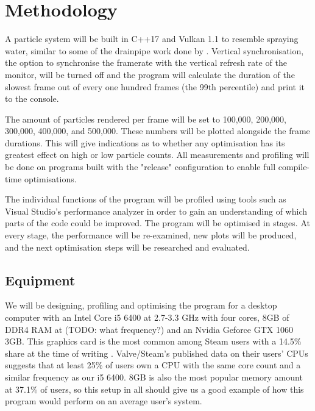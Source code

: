 \documentclass[11pt, a4paper, twocolumn]{article}
\begin{document}
\section{Methodology}

A particle system will be built in C++17 and Vulkan 1.1 to resemble spraying water, similar to some of the drainpipe work done by \citet{Tatarchuk2006}. Vertical synchronisation, the option to synchronise the framerate with the vertical refresh rate of the monitor, will be turned off and the program will calculate the duration of the slowest frame out of every one hundred frames (the 99th percentile) and print it to the console.


The amount of particles rendered per frame will be set to 100,000, 200,000, 300,000, 400,000, and 500,000. These numbers will be plotted alongside the frame durations. This will give indications as to whether any optimisation has its greatest effect on high or low particle counts. All measurements and profiling will be done on programs built with the "release" configuration to enable full compile-time optimisations.

The individual functions of the program will be profiled using tools such as Visual Studio's performance analyzer \citep{VSPerfTools} in order to gain an understanding of which parts of the code could be improved. The program will be optimised in stages. At every stage, the performance will be re-examined, new plots will be produced, and the next optimisation steps will be researched and evaluated.

\subsection{Equipment}

We will be designing, profiling and optimising the program for a desktop computer with an Intel Core i5 6400 at 2.7-3.3 GHz with four cores, 8GB of DDR4 RAM at (TODO: what frequency?) and an Nvidia Geforce GTX 1060 3GB. This  graphics card is the most common among Steam users with a 14.5\% share at the time of writing \citep{SteamSurvey}. Valve/Steam's published data on their users' CPUs suggests that at least 25\% of users own a CPU with the same core count and a similar frequency as our i5 6400. 8GB is also the most popular memory amount at 37.1\% of users, so this setup in all should give us a good example of how this program would perform on an average user's system.
\end{document}
